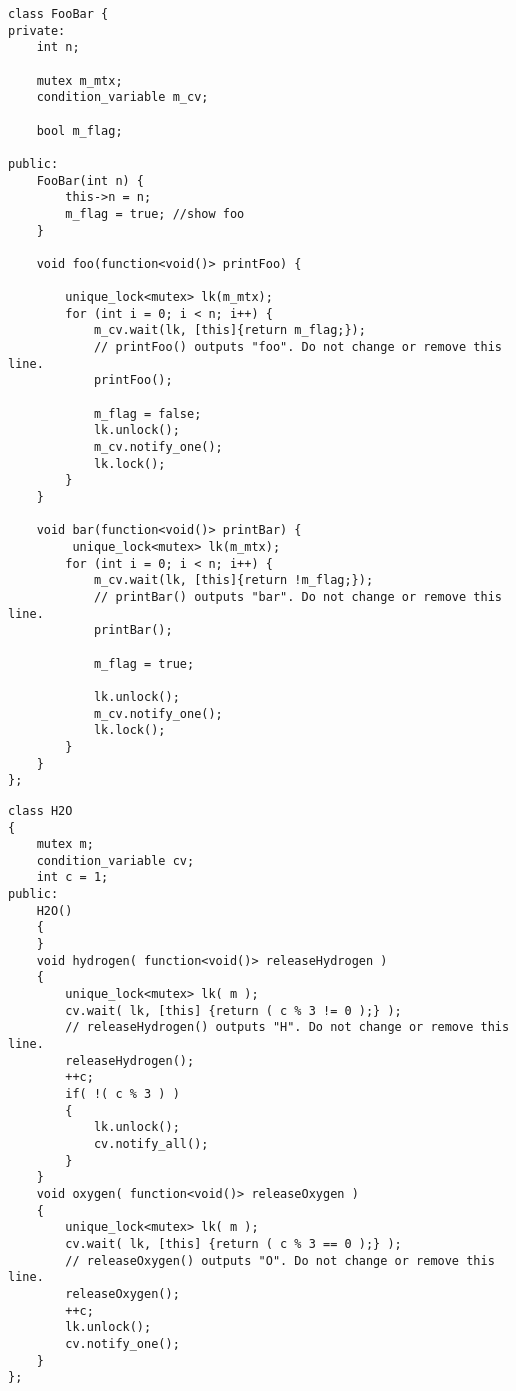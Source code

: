 \setcounter{lstlisting}{0}
\begin{lstlisting}[style=customc, caption={Condition Variable}]
class FooBar {
private:
    int n;
    
    mutex m_mtx;
    condition_variable m_cv;
    
    bool m_flag;

public:
    FooBar(int n) {
        this->n = n;
        m_flag = true; //show foo
    }

    void foo(function<void()> printFoo) {
        
        unique_lock<mutex> lk(m_mtx);
        for (int i = 0; i < n; i++) {
            m_cv.wait(lk, [this]{return m_flag;});
        	// printFoo() outputs "foo". Do not change or remove this line.
        	printFoo();
            
            m_flag = false;
            lk.unlock();
            m_cv.notify_one();
            lk.lock();
        }
    }

    void bar(function<void()> printBar) {
         unique_lock<mutex> lk(m_mtx);
        for (int i = 0; i < n; i++) {
            m_cv.wait(lk, [this]{return !m_flag;});
        	// printBar() outputs "bar". Do not change or remove this line.
        	printBar();
            
            m_flag = true;
            
            lk.unlock();
            m_cv.notify_one();
            lk.lock();
        }
    }
};
\end{lstlisting}

\begin{lstlisting}[style=customc, caption={1117}]
class H2O
{
    mutex m;
    condition_variable cv;
    int c = 1;
public:
    H2O()
    {
    }
    void hydrogen( function<void()> releaseHydrogen )
    {
        unique_lock<mutex> lk( m );
        cv.wait( lk, [this] {return ( c % 3 != 0 );} );
        // releaseHydrogen() outputs "H". Do not change or remove this line.
        releaseHydrogen();
        ++c;
        if( !( c % 3 ) )
        {
            lk.unlock();
            cv.notify_all();
        }
    }
    void oxygen( function<void()> releaseOxygen )
    {
        unique_lock<mutex> lk( m );
        cv.wait( lk, [this] {return ( c % 3 == 0 );} );
        // releaseOxygen() outputs "O". Do not change or remove this line.
        releaseOxygen();
        ++c;
        lk.unlock();
        cv.notify_one();
    }
};
\end{lstlisting}